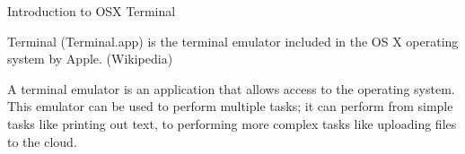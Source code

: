 Introduction to OSX Terminal

Terminal (Terminal.app) is the terminal emulator included in the OS X operating system by Apple. (Wikipedia)

A terminal emulator is an application that allows access to the operating system. This emulator can be used to perform multiple tasks; it can perform from simple tasks like printing out text, to performing more complex tasks like uploading files to the cloud.

